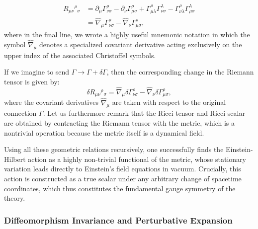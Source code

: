 \[
    \begin{aligned}
        R_{\mu\nu}{}^\rho{}_\sigma & = \partial_\mu \Gamma^\rho_{\nu\sigma} - \partial_\nu \Gamma^\rho_{\mu\sigma} + \Gamma^\rho_{\mu\lambda}\Gamma^\lambda_{\nu\sigma} - \Gamma^\rho_{\nu\lambda}\Gamma^\lambda_{\mu\sigma} \\
                                   & = \hat{\nabla}_\mu \Gamma^\rho_{\nu\sigma} - \hat{\nabla}_\nu \Gamma^\rho_{\mu\sigma},
    \end{aligned}
\]
where in the final line, we wrote a highly useful mnemonic notation in which the symbol \(\hat{\nabla}_\mu\) denotes a specialized covariant derivative acting exclusively on the upper index of the associated Christoffel symbols.

If we imagine to send \(\Gamma \to \Gamma + \delta\Gamma\), then the corresponding change in the Riemann tensor is given by:
\[
    \delta R_{\mu\nu}{}^\rho{}_\sigma = \hat{\nabla}_\mu \delta\Gamma^\rho_{\nu\sigma} - \hat{\nabla}_\nu \delta\Gamma^\rho_{\mu\sigma},
\]
where the covariant derivatives \(\hat{\nabla}_\mu\) are taken with respect to the original connection \(\Gamma\). Let us furthermore remark that the Ricci tensor and Ricci scalar are obtained by contracting the Riemann tensor with the metric, which is a nontrivial operation because the metric itself is a dynamical field.

Using all these geometric relations recursively, one successfully finds the Einstein-Hilbert action as a highly non-trivial functional of the metric, whose stationary variation leads directly to Einstein's field equations in vacuum. Crucially, this action is constructed as a true scalar under any arbitrary change of spacetime coordinates, which thus constitutes the fundamental gauge symmetry of the theory.

\subsubsection{Diffeomorphism Invariance and Perturbative Expansion}

